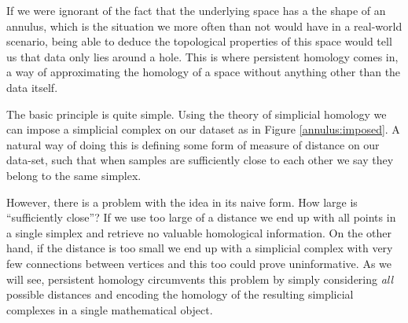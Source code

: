 If we were ignorant of the fact that the underlying space has a the shape of an annulus, which is the situation we more often than not would have in a real-world scenario, being able to deduce the topological properties of this space would tell us that data only lies around a hole. This is where persistent homology comes in, a way of approximating the homology of a space without anything other than the data itself.

The basic principle is quite simple. Using the theory of simplicial homology we can impose a simplicial complex on our dataset as in Figure \ref{annulus:imposed}. A natural way of doing this is defining some form of measure of distance on our data-set, such that when samples are sufficiently close to each other we say they belong to the same simplex.

However, there is a problem with the idea in its naive form. How large is ``sufficiently close''? If we use too large of a distance we end up with all points in a single simplex and retrieve no valuable homological information. On the other hand, if the distance is too small we end up with a simplicial complex with very few connections between vertices and this too could prove uninformative. As we will see, persistent homology circumvents this problem by simply considering \textit{all} possible distances and encoding the homology of the resulting simplicial complexes in a single mathematical object.




